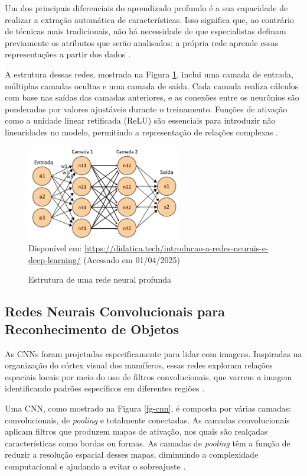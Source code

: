 Um dos principais diferenciais do aprendizado profundo é a sua capacidade de realizar a extração automática de características. Isso significa que, ao contrário de técnicas mais tradicionais, não há necessidade de que especialistas definam previamente os atributos que serão analisados: a própria rede aprende essas representações a partir dos dados \cite{Agarwal2021-deeplearning}.

A estrutura dessas redes, mostrada na Figura \ref{fg0}, inclui uma camada de entrada, múltiplas camadas ocultas e uma camada de saída. Cada camada realiza cálculos com base nas saídas das camadas anteriores, e as conexões entre os neurônios são ponderadas por valores ajustáveis durante o treinamento. Funções de ativação como a unidade linear retificada (ReLU) são essenciais para introduzir não linearidades no modelo, permitindo a representação de relações complexas \cite{gu2018}.

\begin{figure}[htbp]
  \centering
  \caption{Estrutura de uma rede neural profunda}
  \includegraphics[width=0.6\textwidth]{Figuras/Est-rede-neural-profunda.png}
  \\
  Disponível em: \url{https://didatica.tech/introducao-a-redes-neurais-e-deep-learning/} (Acessado em 01/04/2025)
  \label{fg0}
\end{figure}

\subsection{\textbf{Redes Neurais Convolucionais para Reconhecimento de Objetos}}
As CNNs foram projetadas especificamente para lidar com imagens. Inspiradas na organização do córtex visual dos mamíferos, essas redes exploram relações espaciais locais por meio do uso de filtros convolucionais, que varrem a imagem identificando padrões específicos em diferentes regiões \cite{lecun2015}.

Uma CNN, como mostrado na Figura \ref{fg-cnn}, é composta por várias camadas: convolucionais, de \textit{pooling} e totalmente conectadas. As camadas convolucionais aplicam filtros que produzem mapas de ativação, nos quais são realçadas características como bordas ou formas. As camadas de \textit{pooling} têm a função de reduzir a resolução espacial desses mapas, diminuindo a complexidade computacional e ajudando a evitar o sobreajuste \cite{gu2018}.

